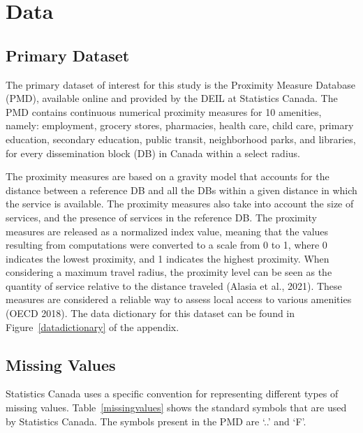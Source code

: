 \documentclass[11pt, a4paper]{article}
\begin{document}
\pagebreak
\section{Data}




\subsection{Primary Dataset}

The primary dataset of interest for this study is the Proximity Measure Database (PMD), available online and provided by the DEIL at Statistics Canada. The PMD contains continuous numerical proximity measures for 10 amenities, namely: employment, grocery stores, pharmacies, health care, child care, primary education, secondary education, public transit, neighborhood parks, and libraries, for every dissemination block (DB) in Canada within a select radius.
\par
The proximity measures are based on a gravity model that accounts for the distance between a reference DB and all the DBs within a given distance in which the service is available. The proximity measures also take into account the size of services, and the presence of services in the reference DB. The proximity measures are released as a normalized index value, meaning that the values resulting from computations were converted to a scale from 0 to 1, where 0 indicates the lowest proximity, and 1 indicates the highest proximity. When considering a maximum travel radius, the proximity level can be seen as the quantity of service relative to the distance traveled (Alasia et al., 2021). These measures are considered a reliable way to assess local access to various amenities (OECD 2018). The data dictionary for this dataset can be found in Figure~\ref{datadictionary} of the appendix.







\subsection{Missing Values}


Statistics Canada uses a specific convention for representing different types of missing values. Table~\ref{missingvalues} shows the standard symbols that are used by Statistics Canada. The symbols present in the PMD are `..' and `F'.
\end{document}
